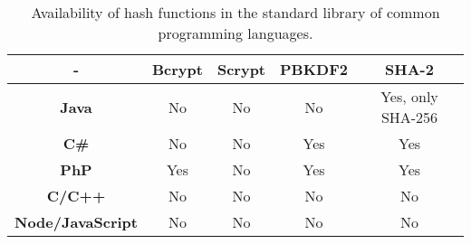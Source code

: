 	\begin{table}[h!]
		\begin{center}
			\begin{tabular}{|c|c|c|c|c|}
				\hline
				- & \textbf{Bcrypt} & \textbf{Scrypt} & \textbf{PBKDF2} & \textbf{SHA-2}\\\hline
				\textbf{Java} & No & No & No & Yes, only SHA-256 \\\hline
				\textbf{C\#} & No & No & Yes & Yes \\\hline
				\textbf{PhP} & Yes & No & Yes & Yes \\\hline
				\textbf{C/C++} & No & No & No & No \\\hline
				\textbf{Node/JavaScript} & No & No & No & No \\\hline
			\end{tabular}
			\caption{Availability of hash functions in the standard library of common programming languages. }
			\label{tab:table12}
		\end{center}
	\end{table}